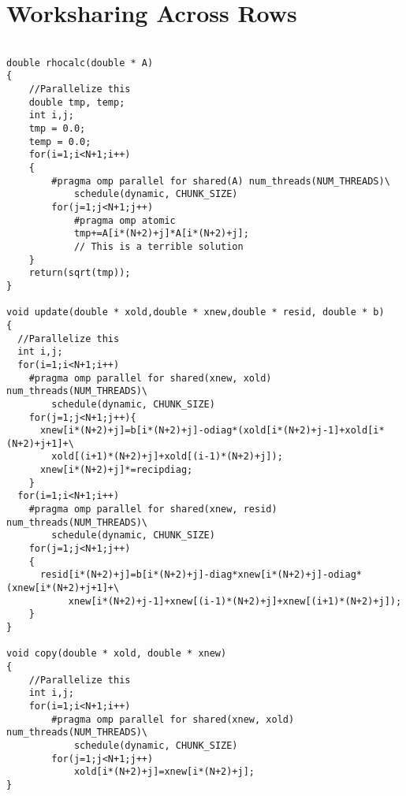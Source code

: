 \documentclass[11pt]{article}
\begin{document}
\section{Worksharing Across Rows}
\begin{lstlisting}

double rhocalc(double * A)
{
	//Parallelize this
	double tmp, temp;
	int i,j;
	tmp = 0.0;
	temp = 0.0;
	for(i=1;i<N+1;i++)
	{
		#pragma omp parallel for shared(A) num_threads(NUM_THREADS)\
			schedule(dynamic, CHUNK_SIZE)
		for(j=1;j<N+1;j++)
			#pragma omp atomic
			tmp+=A[i*(N+2)+j]*A[i*(N+2)+j];
			// This is a terrible solution
	}
	return(sqrt(tmp));
}

void update(double * xold,double * xnew,double * resid, double * b)
{
  //Parallelize this
  int i,j;
  for(i=1;i<N+1;i++)
	#pragma omp parallel for shared(xnew, xold) num_threads(NUM_THREADS)\
		schedule(dynamic, CHUNK_SIZE)
    for(j=1;j<N+1;j++){
      xnew[i*(N+2)+j]=b[i*(N+2)+j]-odiag*(xold[i*(N+2)+j-1]+xold[i*(N+2)+j+1]+\
	    xold[(i+1)*(N+2)+j]+xold[(i-1)*(N+2)+j]);
      xnew[i*(N+2)+j]*=recipdiag;
    }
  for(i=1;i<N+1;i++)
  	#pragma omp parallel for shared(xnew, resid) num_threads(NUM_THREADS)\
		schedule(dynamic, CHUNK_SIZE)
    for(j=1;j<N+1;j++)
    {
      resid[i*(N+2)+j]=b[i*(N+2)+j]-diag*xnew[i*(N+2)+j]-odiag*(xnew[i*(N+2)+j+1]+\
           xnew[i*(N+2)+j-1]+xnew[(i-1)*(N+2)+j]+xnew[(i+1)*(N+2)+j]);
    } 
} 
  
void copy(double * xold, double * xnew)
{
	//Parallelize this
	int i,j;
	for(i=1;i<N+1;i++)
		#pragma omp parallel for shared(xnew, xold) num_threads(NUM_THREADS)\
			schedule(dynamic, CHUNK_SIZE)
		for(j=1;j<N+1;j++)
			xold[i*(N+2)+j]=xnew[i*(N+2)+j];
}

\end{lstlisting}
\end{document}
